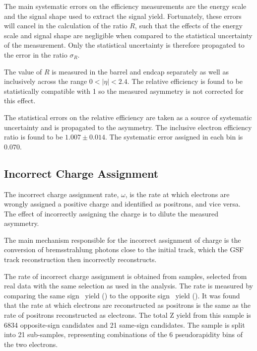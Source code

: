 The main systematic errors on the efficiency measurements are the energy scale
and the signal shape used to extract the signal yield. Fortunately, these
errors will cancel in the calculation of the ratio $R$, such that the
effects of the energy scale and signal shape are negligible
when compared to the statistical uncertainty of the measurement. Only the
statistical uncertainty is therefore propagated to the error in the ratio
$\sigma_R$.


The value of $R$ is measured in the barrel and endcap separately as well as inclusively
across the range $0<| \eta |< 2.4$. 
The relative efficiency is found to be statistically compatible with 1 so the
measured asymmetry is not corrected for this effect.

The statistical errors on the relative efficiency are taken as a source of
systematic uncertainty and is propagated to the asymmetry. The inclusive
electron efficiency ratio is found to be $1.007\pm0.014$.  The systematic error
assigned in each bin is $0.070$. 

\subsection{Incorrect Charge Assignment}

The incorrect charge assignment rate, $\omega$, is the rate at which electrons are
wrongly assigned a positive charge and identified as positrons, and vice versa.
The effect of incorrectly assigning the charge is to dilute the measured
asymmetry.

The main mechanism responsible for the incorrect assignment of charge is the
conversion of bremsstrahlung photons close to the initial track, which the GSF
track reconstruction then incorrectly reconstructs.

The rate of incorrect charge assignment is obtained from \Zee samples, selected from
real data with the same selection as used in the analysis. 
The rate is measured by comparing the
same sign \PZ\ yield (\HepProcess{\PZ\to\Pepm\Pepm}) to the opposite sign \PZ\
yield (\HepProcess{\PZ\to\Pelectron\APelectron}).
It was found that the rate at which electrons are reconstructed as positrons is
the same as the rate of positrons reconstructed as electrons.
The total Z yield from this sample is 6834 opposite-sign \PZ candidates and 21
same-sign \PZ candidates.
The sample is split into 21 sub-samples, representing
combinations of the 6 pseudorapidity bins of the two electrons.


